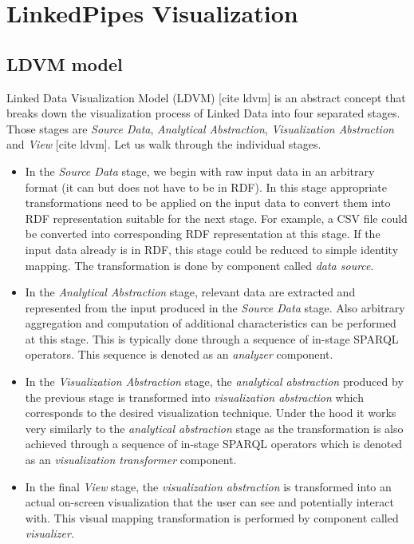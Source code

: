\chapter{LinkedPipes Visualization}


\section{LDVM model}

Linked Data Visualization Model (LDVM) [cite ldvm] is an abstract concept that breaks down the visualization process of Linked Data into four separated stages. Those stages are \emph{Source Data}, \emph{Analytical Abstraction}, \emph{Visualization Abstraction} and \emph{View} [cite ldvm]. Let us walk through the individual stages.

\begin{itemize}
\item In the \emph{Source Data} stage, we begin with raw input data in an arbitrary format (it can but does not have to be in RDF). In this stage appropriate transformations need to be applied on the input data to convert them into RDF representation suitable for the next stage. For example, a CSV file could be converted into corresponding RDF representation at this stage. If the input data already is in RDF, this stage could be reduced to simple identity mapping. The transformation is done by component called \emph{data source}.
\item In the \emph{Analytical Abstraction} stage, relevant data are extracted and represented from the input produced in the \emph{Source Data} stage. Also arbitrary aggregation and computation of additional characteristics can be performed at this stage. This is typically done through a sequence of in-stage SPARQL operators. This sequence is denoted as an \emph{analyzer} component.
\item In the \emph{Visualization Abstraction} stage, the \emph{analytical abstraction} produced by the previous stage is transformed into \emph{visualization abstraction} which corresponds to the desired visualization technique. Under the hood it works very similarly to the \emph{analytical abstraction} stage as the transformation is also achieved through a sequence of in-stage SPARQL operators which is denoted as an \emph{visualization transformer} component.
\item In the final \emph{View} stage, the \emph{visualization abstraction} is transformed into an actual on-screen visualization that the user can see and potentially interact with. This visual mapping transformation is performed by component called \emph{visualizer}.
\end{itemize}

